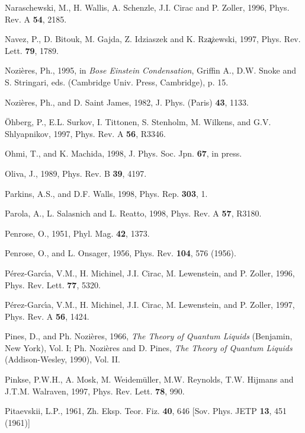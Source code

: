 \begin{references}
 Naraschewski, M., H. Wallis, A. Schenzle, J.I.
Cirac and P. Zoller, 1996, Phys. Rev. A {\bf 54}, 2185.

    Navez, P., D. Bitouk, M. Gajda, Z. Idziaszek and K.
Rz\c{a}\.{z}ewski, 1997, Phys. Rev. Lett. {\bf 79}, 1789.    

  Nozi\`eres, Ph.,  1995, in {\it Bose Einstein
Condensation}, Griffin A., D.W.  Snoke and S. Stringari, eds. (Cambridge
Univ.  Press, Cambridge), p. 15.

  Nozi\`eres, Ph., and D. Saint James, 1982, J. Phys. 
(Paris) {\bf 43}, 1133.

     \"Ohberg, P., E.L. Surkov, I. Tittonen, S.
Stenholm, M. Wilkens, and G.V. Shlyapnikov, 1997, Phys. Rev. A {\bf 56},
R3346.

   Ohmi, T., and K. Machida, 1998, J. Phys. Soc. Jpn. 
{\bf 67}, in press.  

    Oliva, J., 1989, Phys. Rev. B {\bf 39}, 4197.

  Parkins, A.S., and D.F. Walls, 1998, Phys. Rep.
{\bf 303}, 1.

   Parola, A., L. Salasnich and L. Reatto, 1998, Phys.
Rev. A {\bf 57}, R3180.

  Penrose, O., 1951, Phyl. Mag. {\bf 42}, 1373.

  Penrose, O., and L. Onsager, 1956, Phys. Rev. {\bf
104}, 576 (1956).

    P\'erez-Garc\'\i a, V.M., H. Michinel, J.I. Cirac, 
M. Lewenstein, and P. Zoller, 1996, Phys. Rev. Lett. {\bf 77}, 5320.

    P\'erez-Garc\'\i a, V.M., H. Michinel, J.I. Cirac, 
M. Lewenstein, and P. Zoller, 1997, Phys. Rev. A {\bf 56}, 1424.

    Pines, D., and Ph. Nozi\`eres, 1966, {\it The
Theory of Quantum Liquids} (Benjamin, New York), Vol. I; Ph. Nozi\`eres and
D. Pines, {\it The Theory of Quantum Liquids} (Addison-Wesley, 1990), Vol.
II.

   Pinkse, P.W.H., A. Mosk, M. Weidem\"uller, M.W.
Reynolds, T.W. Hijmans and J.T.M. Walraven, 1997, Phys. Rev. Lett. {\bf
78}, 990.

 Pitaevskii, L.P., 1961, Zh. Eksp. Teor. Fiz. {\bf
40}, 646 [Sov. Phys. JETP {\bf 13}, 451 (1961)]


\end{references}
